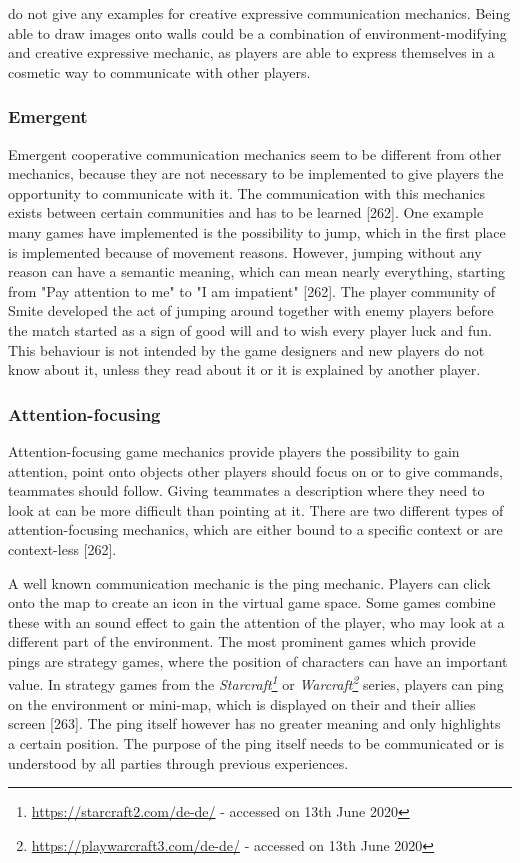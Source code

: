\textcite{Toups2014ATheory} do not give any examples for creative expressive communication mechanics. Being able to draw images onto walls could be a combination of environment-modifying and creative expressive mechanic, as players are able to express themselves in a cosmetic way to communicate with other players.


\subsubsection{Emergent}
\label{section:Emergent}

Emergent cooperative communication mechanics seem to be different from other mechanics, because they are not necessary to be implemented to give players the opportunity to communicate with it. The communication with this mechanics exists between certain communities and has to be learned \autocite{Toups2014ATheory}[262]. One example many games have implemented is the possibility to jump, which in the first place is implemented because of movement reasons. However, jumping without any reason can have a semantic meaning, which can mean nearly everything, starting from "Pay attention to me" to "I am impatient" \autocite{Toups2014ATheory}[262]. 
The player community of Smite developed the act of jumping around together with enemy players before the match started as a sign of good will and to wish every player luck and fun. This behaviour is not intended by the game designers and new players do not know about it, unless they read about it or it is explained by another player.

\subsubsection{Attention-focusing}
\label{section:Attention-focusing}

Attention-focusing game mechanics provide players the possibility to gain attention, point onto objects other players should focus on or to give commands, teammates should follow. Giving teammates a description where they need to look at can be more difficult than pointing at it. There are two different types of attention-focusing mechanics, which are either bound to a specific context or are context-less \autocite{Toups2014ATheory}[262].


A well known communication mechanic is the ping mechanic. Players can click onto the map to create an icon in the virtual game space. Some games combine these with an sound effect to gain the attention of the player, who may look at a different part of the environment.
The most prominent games which provide pings are strategy games, where the position of characters can have an important value. In strategy games from the \textit{Starcraft\footnote{\url{https://starcraft2.com/de-de/} - accessed on 13th June 2020}} or \textit{Warcraft\footnote{\url{https://playwarcraft3.com/de-de/} - accessed on 13th June 2020}} series, players can ping on the environment or mini-map, which is displayed on their and their allies screen \autocite{Toups2014ATheory}[263]. The ping itself however has no greater meaning and only highlights a certain position. The purpose of the ping itself needs to be communicated or is understood by all parties through previous experiences.


